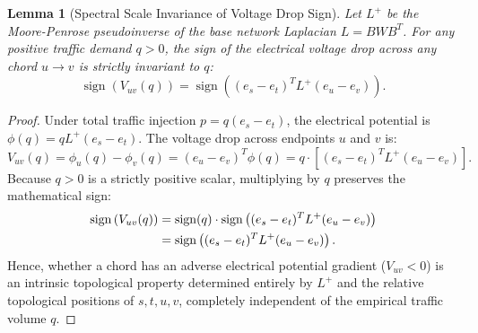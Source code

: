 \documentclass[11pt,a4paper]{article}
\newtheorem{lemma}{Lemma}
\begin{document}
\begin{lemma}[Spectral Scale Invariance of Voltage Drop Sign]
\label{lem:scale_invariance}
Let $L^+$ be the Moore-Penrose pseudoinverse of the base network Laplacian $L = B W B^T$. For any positive traffic demand $q > 0$, the sign of the electrical voltage drop across any chord $u \to v$ is strictly invariant to $q$:
\begin{equation}
\operatorname{sign}\left( V_{uv}(q) \right) = \operatorname{sign}\left( (e_s - e_t)^T L^+ (e_u - e_v) \right).
\end{equation}
\end{lemma}

\begin{proof}
Under total traffic injection $p = q (e_s - e_t)$, the electrical potential is $\phi(q) = q L^+ (e_s - e_t)$. The voltage drop across endpoints $u$ and $v$ is:
\begin{equation}
V_{uv}(q) = \phi_u(q) - \phi_v(q) = (e_u - e_v)^T \phi(q) = q \cdot \left[ (e_s - e_t)^T L^+ (e_u - e_v) \right].
\end{equation}
Because $q > 0$ is a strictly positive scalar, multiplying by $q$ preserves the mathematical sign:
\begin{align}
\operatorname{sign}\left( V_{uv}(q) \right) &= \operatorname{sign}(q) \cdot \operatorname{sign}\left( (e_s - e_t)^T L^+ (e_u - e_v) \right) \notag \\
&= \operatorname{sign}\left( (e_s - e_t)^T L^+ (e_u - e_v) \right).
\end{align}
Hence, whether a chord has an adverse electrical potential gradient ($V_{uv} < 0$) is an intrinsic topological property determined entirely by $L^+$ and the relative topological positions of $s, t, u, v$, completely independent of the empirical traffic volume $q$.
\end{proof}
\end{document}
